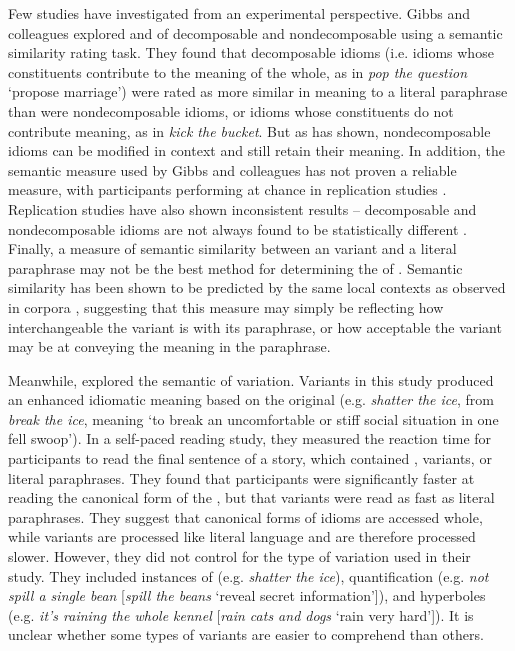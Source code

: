 \documentclass[output=paper
,modfonts
,nonflat]{langsci/langscibook}
\begin{document}
Few studies have investigated  from an experimental perspective. Gibbs and colleagues \citep{GibbsEtAl1989, GibbsNayak1989} explored   and  of decomposable and nondecomposable  using a semantic similarity rating task. They found that decomposable  idioms (i.e. idioms whose constituents contribute to the meaning of the whole, as in \textit{pop the question} `propose marriage') were rated as more similar in meaning to a literal paraphrase  than were nondecomposable idioms, or idioms whose constituents do not contribute meaning, as in \textit{kick the bucket}. But as \citet{Duffley2013} has shown, nondecomposable idioms can be modified in context and still retain their meaning. In addition, the semantic  measure used by Gibbs and colleagues has not proven a reliable measure, with participants performing at chance in replication studies \citep{TitoneConnine1994, TabossiEtAl2008}. Replication studies have also shown inconsistent results -- decomposable and nondecomposable idioms are not always found to be statistically different \citep{TabossiEtAl2008}. Finally, a measure of semantic similarity between an  variant and a literal paraphrase may not be the best method for determining the  of . Semantic similarity has been shown to be predicted  by the same local contexts as observed in corpora \citep{MillerCharles1991}, suggesting that this measure may simply be reflecting how interchangeable the variant is with its paraphrase, or how acceptable  the variant may be at conveying the meaning in the paraphrase.

Meanwhile, \citet{McGloneEtAl1994} explored the semantic  of  variation.  Variants in this study produced an enhanced idiomatic meaning based on the original (e.g. \textit{shatter the ice}, from \textit{break the ice}, meaning `to break an uncomfortable or stiff social situation in one fell swoop'). In a self-paced reading study, they measured the reaction time for participants to read the final sentence of a story, which contained , variants, or literal paraphrases.  They found that participants were significantly faster at reading the canonical form of the , but that variants were read as fast as literal paraphrases. They suggest that canonical forms of idioms are accessed whole, while variants are processed like literal language and are therefore processed slower. However, they did not control for the type of variation used in their study. They included instances of  (e.g. \textit{shatter the ice}), quantification (e.g. \textit{not spill a single bean} [\textit{spill the beans} `reveal secret information']), and hyperboles (e.g. \textit{it's raining the whole kennel} [\textit{rain cats and dogs} `rain very hard']). It is unclear whether some types of variants are easier to comprehend  than others. 
\end{document}
